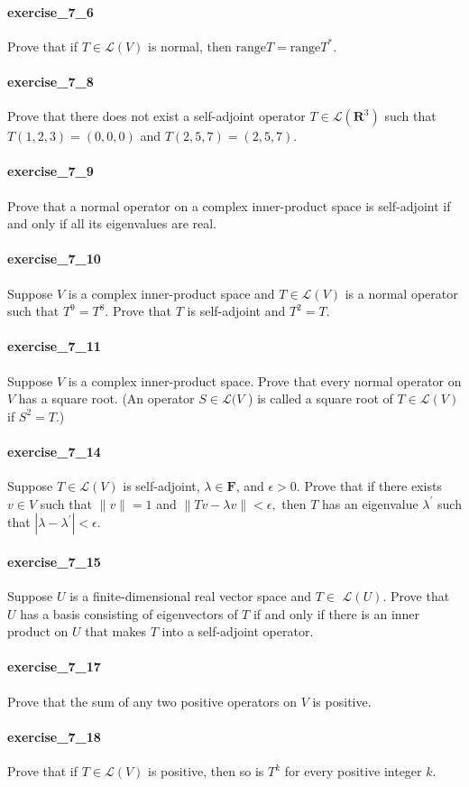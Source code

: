 \documentclass{article}
\begin{document}
\paragraph{exercise\_7\_6} Prove that if $T \in \mathcal{L}(V)$ is normal, then $\mathrm{range} T=\mathrm{range} T^{*}.$

\paragraph{exercise\_7\_8} Prove that there does not exist a self-adjoint operator $T \in \mathcal{L}\left(\mathbf{R}^{3}\right)$ such that $T(1,2,3)=(0,0,0)$ and $T(2,5,7)=(2,5,7)$.

\paragraph{exercise\_7\_9} Prove that a normal operator on a complex inner-product space is self-adjoint if and only if all its eigenvalues are real.

\paragraph{exercise\_7\_10} Suppose $V$ is a complex inner-product space and $T \in \mathcal{L}(V)$ is a normal operator such that $T^{9}=T^{8}$. Prove that $T$ is self-adjoint and $T^{2}=T$.

\paragraph{exercise\_7\_11} Suppose $V$ is a complex inner-product space. Prove that every normal operator on $V$ has a square root. (An operator $S \in \mathcal{L}(V$ ) is called a square root of $T \in \mathcal{L}(V)$ if $S^{2}=T$.)

\paragraph{exercise\_7\_14} Suppose $T \in \mathcal{L}(V)$ is self-adjoint, $\lambda \in \mathbf{F}$, and $\epsilon>0$. Prove that if there exists $v \in V$ such that $\|v\|=1$ and $\|T v-\lambda v\|<\epsilon,$ then $T$ has an eigenvalue $\lambda^{\prime}$ such that $\left|\lambda-\lambda^{\prime}\right|<\epsilon$.

\paragraph{exercise\_7\_15} Suppose $U$ is a finite-dimensional real vector space and $T \in$ $\mathcal{L}(U)$. Prove that $U$ has a basis consisting of eigenvectors of $T$ if and only if there is an inner product on $U$ that makes $T$ into a self-adjoint operator.

\paragraph{exercise\_7\_17} Prove that the sum of any two positive operators on $V$ is positive.

\paragraph{exercise\_7\_18} Prove that if $T \in \mathcal{L}(V)$ is positive, then so is $T^{k}$ for every positive integer $k$.
\end{document}
